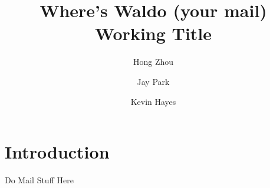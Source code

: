 \documentclass[format=sigconf, nonacm=true, balance=false]{acmart}
\title{Where's Waldo (your mail) Working Title}
\author{Hong Zhou}
\affiliation{
  \institution{Northwestern University}
  \city{Evanston}
  \state{Illinois}
  \country{USA}
  }
\author{Jay Park}
\affiliation{
  \institution{Northwestern University}
  \city{Evanston}
  \state{Illinois}
  \country{USA}
  }
\author{Kevin Hayes}
\affiliation{
  \institution{Northwestern University}
  \city{Evanston}
  \state{Illinois}
  \country{USA}
  }
\begin{document}
\begin{abstract}

\end{abstract}

\maketitle

\section{Introduction}

Do Mail Stuff Here


{}
\end{document}
